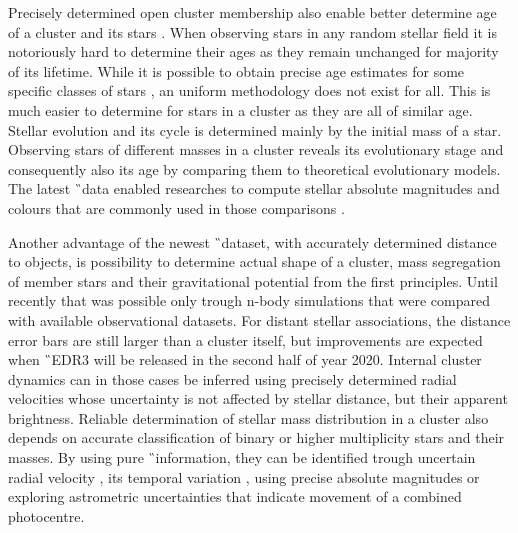 Precisely determined open cluster membership also enable better determine age of a cluster and its stars \cite{2018ApJ...863...65C}. When observing stars in any random stellar field it is notoriously hard to determine their ages as they remain unchanged for majority of its lifetime. While it is possible to obtain precise age estimates for some specific classes of stars \cite{2010ARA&A..48..581S}, an uniform methodology does not exist for all. This is much easier to determine for stars in a cluster as they are all of similar age. Stellar evolution and its cycle is determined mainly by the initial mass of a star. Observing stars of different masses in a cluster reveals its evolutionary stage and consequently also its age by comparing them to theoretical evolutionary models. The latest \G\ data enabled researches to compute stellar absolute magnitudes and colours that are commonly used in those comparisons \cite{2019MNRAS.487.2385M, 2019A&A...623A.108B, 2019A&A...631A.166K}.

Another advantage of the newest \G\ dataset, with accurately determined distance to objects, is possibility to determine actual shape of a cluster, mass segregation of member stars and their gravitational potential from the first principles. Until recently that was possible only trough n-body simulations \cite{1987MNRAS.224..193T, 2016MNRAS.456.3757S, 2018MNRAS.473..849D} that were compared with available observational datasets. For distant stellar associations, the distance error bars are still larger than a cluster itself, but improvements are expected when \G\ EDR3 will be released in the second half of year 2020. Internal cluster dynamics can in those cases be inferred using precisely determined radial velocities whose uncertainty is not affected by stellar distance, but their apparent brightness. Reliable determination of stellar mass distribution in a cluster also depends on accurate classification of binary or higher multiplicity stars and their masses. By using pure \G\ information, they can be identified trough uncertain radial velocity \cite{2018RNAAS...2b..20E}, its temporal variation \cite{2019AJ....158..155B}, using precise absolute magnitudes \cite{2018ApJ...857..114W, 2018A&A...616A..10G, 2019MNRAS.487.2474} or exploring astrometric uncertainties \cite{2020arXiv200305467B} that indicate movement of a combined photocentre. 


